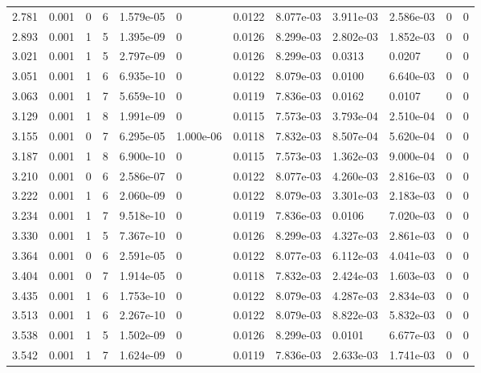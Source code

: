 \documentclass[preview]{standalone}
\begin{document}
{{{\begin{tabular}{L{1.2cm}C{1.2cm} C{0.3cm}C{0.5cm} C{1.4cm}C{1.4cm} C{1.4cm}C{1.4cm} C{1.6cm}C{1.6cm} C{1.6cm}C{1.6cm}}
  2.781  &  0.001  & 0     &  6 &  1.579e-05  & 0  &  0.0122&   8.077e-03& 3.911e-03 & 2.586e-03   &  0 & 0  \\ 
  2.893  &  0.001  & 1     &  5 &  1.395e-09  & 0  &  0.0126&   8.299e-03& 2.802e-03 & 1.852e-03   &  0 & 0  \\ 
  3.021  &  0.001  & 1     &  5 &  2.797e-09  & 0  &  0.0126&   8.299e-03& 0.0313 & 0.0207   &  0 & 0  \\ 
  3.051  &  0.001  & 1     &  6 &  6.935e-10  & 0  &  0.0122&   8.079e-03& 0.0100 & 6.640e-03   &  0 & 0  \\ 
  3.063  &  0.001  & 1     &  7 &  5.659e-10  & 0  &  0.0119&   7.836e-03& 0.0162 & 0.0107   &  0 & 0  \\ 
  3.129  &  0.001  & 1     &  8 &  1.991e-09  & 0  &  0.0115&   7.573e-03& 3.793e-04 & 2.510e-04   &  0 & 0  \\ 
  3.155  &  0.001  & 0     &  7 &  6.295e-05  & 1.000e-06  &  0.0118&   7.832e-03& 8.507e-04 & 5.620e-04   &  0 & 0  \\ 
  3.187  &  0.001  & 1     &  8 &  6.900e-10  & 0  &  0.0115&   7.573e-03& 1.362e-03 & 9.000e-04   &  0 & 0  \\ 
  3.210  &  0.001  & 0     &  6 &  2.586e-07  & 0  &  0.0122&   8.077e-03& 4.260e-03 & 2.816e-03   &  0 & 0  \\ 
  3.222  &  0.001  & 1     &  6 &  2.060e-09  & 0  &  0.0122&   8.079e-03& 3.301e-03 & 2.183e-03   &  0 & 0  \\ 
  3.234  &  0.001  & 1     &  7 &  9.518e-10  & 0  &  0.0119&   7.836e-03& 0.0106 & 7.020e-03   &  0 & 0  \\ 
  3.330  &  0.001  & 1     &  5 &  7.367e-10  & 0  &  0.0126&   8.299e-03& 4.327e-03 & 2.861e-03   &  0 & 0  \\ 
  3.364  &  0.001  & 0     &  6 &  2.591e-05  & 0  &  0.0122&   8.077e-03& 6.112e-03 & 4.041e-03   &  0 & 0  \\ 
  3.404  &  0.001  & 0     &  7 &  1.914e-05  & 0  &  0.0118&   7.832e-03& 2.424e-03 & 1.603e-03   &  0 & 0  \\ 
  3.435  &  0.001  & 1     &  6 &  1.753e-10  & 0  &  0.0122&   8.079e-03& 4.287e-03 & 2.834e-03   &  0 & 0  \\ 
  3.513  &  0.001  & 1     &  6 &  2.267e-10  & 0  &  0.0122&   8.079e-03& 8.822e-03 & 5.832e-03   &  0 & 0  \\ 
  3.538  &  0.001  & 1     &  5 &  1.502e-09  & 0  &  0.0126&   8.299e-03& 0.0101 & 6.677e-03   &  0 & 0  \\ 
  3.542  &  0.001  & 1     &  7 &  1.624e-09  & 0  &  0.0119&   7.836e-03& 2.633e-03 & 1.741e-03   &  0 & 0  \\ 

\end{tabular}}}}
\end{document}
